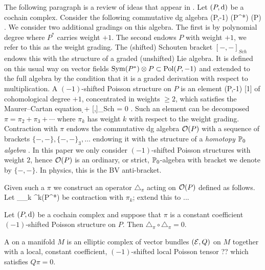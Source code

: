 \documentclass[11pt]{amsart}
\renewcommand{\op}{\operatorname}
\begin{document}
The following paragraph is a review of ideas that appear in \cite{PavelPoisson}.
Let $(P,{\rm d})$ be a cochain complex. Consider the following commutative dg algebra
\beqn
\op{Pol}(P,-1)  \Sym(P^*) \otimes \Sym(P) .
\eeqn
We consider two additional gradings on this algebra.
The first is by polynomial degree where $P^*$ carries weight $+1$.
The second endows $P$ with weight $+1$, we refer to this as the weight grading.
The (shifted) Schouten bracket $[-,-]_{Sch}$ endows this with the structure of a graded (unshifted) Lie algebra. 
It is defined on this usual way on vector fields $\Sym(P^*) \otimes P \subset \op{Pol}(P,-1)$ and extended to the full algebra by the condition that it is a graded derivation with respect to multiplication.
A $(-1)$-shifted Poisson structure on $P$ is an element
\beqn
\pi \in \op{Pol}(P,-1) [1]
\eeqn
of cohomological degree $+1$, concentrated in weights $\geq 2$, which satisfies the Maurer--Cartan equation
\beqn
\d \pi +  [\pi,\pi]_{Sch} = 0 .
\eeqn
Such an element can be decomposed $\pi = \pi_2 + \pi_3 + \cdots$ where $\pi_k$ has weight $k$ with respect to the weight grading.
Contraction with $\pi$ endows the commutative dg algebra $\mathcal O(P)$ with a sequence of brackets $\{-,-\}, \{-,-\}_3, \ldots$ endowing it with the structure of a \textit{homotopy $\mathbb P_0$ algebra} \cite{??}.
In this paper we only consider $(-1)$-shifted Poisson structures with weight $2$, hence $\mathcal O(P)$ is an ordinary, or strict, $\mathbb P_0$-algebra with bracket we denote by $\{-,-\}$.
In physics, this is the BV anti-bracket.

Given such a $\pi$ we construct an operator $\triangle_\pi$ acting on $\mathcal O(P)$ defined as follows.
Let 
\beqn
\triangle_{\pi_k} \colon \Sym^k(P^*) \to \C 
\eeqn
be contraction with $\pi_k$; extend this to ... 



\begin{prop}
Let $(P,{\rm d})$ be a cochain complex and suppose that $\pi$ is a constant coefficient $(-1)$-shifted Poisson structure on $P$.
Then $\triangle_\pi \circ \triangle_\pi = 0$.
\end{prop}

\begin{dfn}\label{dfn:free}
A  on a manifold $M$ is an elliptic complex of vector bundles $(\mathcal E,Q)$ on $M$ together with a local, constant coefficient, $(-1)$-shifted local Poisson tensor
\beqn
\pi \in ??
\eeqn
which satisfies $Q \pi = 0$.
\end{dfn}
\end{document}
